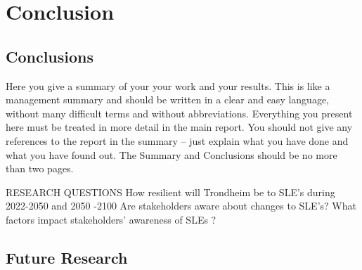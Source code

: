
\chapter{Conclusion}
\section{Conclusions}
Here you give a summary of your your work and your results. This is like a management summary and should be written in a clear and easy language, without many difficult terms and without abbreviations. Everything you present here must be treated in more detail in the main report. You should not give any references to the report in the summary -- just explain what you have done and what you have found out. The Summary and Conclusions should be no more than two pages.

RESEARCH QUESTIONS
How resilient will Trondheim be to SLE’s during 2022-2050 and 2050 -2100
Are stakeholders aware about changes to SLE’s?
What factors impact stakeholders’ awareness of SLEs ?

\section{Future Research}
